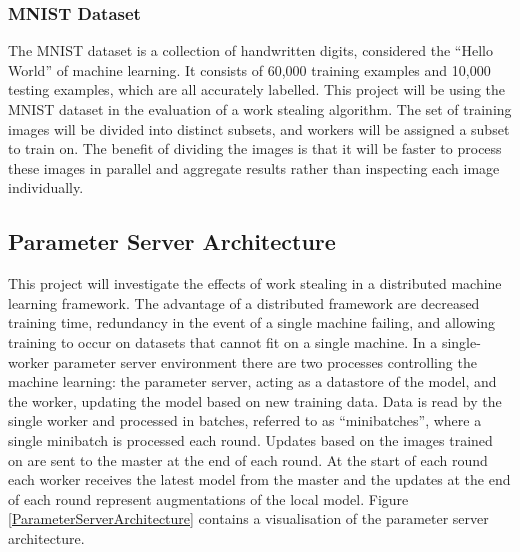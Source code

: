 \documentclass[12pt]{article}
\begin{document}
\subsubsection{MNIST Dataset}
The MNIST dataset is a collection of handwritten digits, considered the ``Hello World'' of machine learning. It consists of 60,000 training examples and 10,000 testing examples, which are all accurately labelled. This project will be using the MNIST dataset in the evaluation of a work stealing algorithm. The set of training images will be divided into distinct subsets, and workers will be assigned a subset to train on. The benefit of dividing the images is that it will be faster to process these images in parallel and aggregate results rather than inspecting each image individually.

\subsection{Parameter Server Architecture} \label{paramserver}
This project will investigate the effects of work stealing in a distributed machine learning framework. The advantage of a distributed framework are decreased training time, redundancy in the event of a single machine failing, and allowing training to occur on datasets that cannot fit on a single machine.
\newline
\newline
In a single-worker parameter server environment there are two processes controlling the machine learning: the parameter server, acting as a datastore of the model, and the worker, updating the model based on new training data. Data is read by the single worker and processed in batches, referred to as ``minibatches'', where a single minibatch is processed each round. Updates based on the images trained on are sent to the master at the end of each round. At the start of each round each worker receives the latest model from the master and the updates at the end of each round represent augmentations of the local model.
\newline
\newline
Figure \ref{ParameterServerArchitecture} contains a visualisation of the parameter server architecture.
\end{document}
